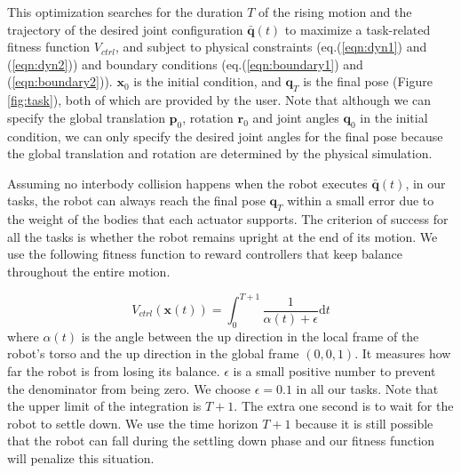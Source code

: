 This optimization searches for the duration $T$ of the rising motion and the trajectory of the desired joint configuration $\bar{\mathbf{q}}(t)$ to maximize a task-related fitness function $V_{ctrl}$, and subject to physical constraints (eq.(\ref{eqn:dyn1}) and (\ref{eqn:dyn2})) and boundary conditions (eq.(\ref{eqn:boundary1}) and (\ref{eqn:boundary2})). $\mathbf{x}_0$ is the initial condition, and $\mathbf{q}_T$ is the final pose (Figure \ref{fig:task}), both of which are provided by the user. Note that although we can specify the global translation $\mathbf{p}_0$, rotation $\mathbf{r}_0$ and joint angles $\mathbf{q}_0$ in the initial condition, we can only specify the desired joint angles for the final pose because the global translation and rotation are determined by the physical simulation.

Assuming no interbody collision happens when the robot executes $\bar{\mathbf{q}}(t)$, in our tasks, the robot can always reach the final pose $\mathbf{q}_T$ within a small error due to the weight of the bodies that each actuator supports. The criterion of success for all the tasks is whether the robot remains upright at the end of its motion. We use the following fitness function to reward controllers that keep balance throughout the entire motion.

\begin{equation}
  V_{ctrl}(\mathbf{x}(t))=\int_0^{T+1} \frac{1}{\alpha(t)+\epsilon}\mathrm{d}t
  \label{eqn:controllerObj}
\end{equation}
where $\alpha(t)$ is the angle between the up direction in the local frame of the robot's torso and the up direction in the global frame $(0,0,1)$. It measures how far the robot is from losing its balance. $\epsilon$ is a small positive number to prevent the denominator from being zero. We choose $\epsilon=0.1$ in all our tasks. Note that the upper limit of the integration is $T+1$. The extra one second is to wait for the robot to settle down. We use the time horizon $T+1$ because it is still possible that the robot can fall during the settling down phase and our fitness function will penalize this situation.

